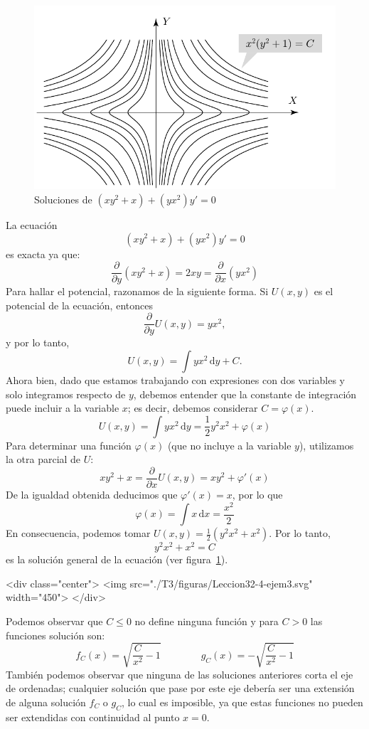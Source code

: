 \begin{latexonly}
\begin{figure}
\begin{center}
\includegraphics[width=.8\textwidth]{T3/figs/ejem3.pdf}
\end{center}
\caption{Soluciones de $(xy^2+x)+(yx^2)y'=0$}\label{ej3}
\end{figure}
\end{latexonly}
%
\begin{ejemplo}\label{42edoexacta}
La ecuación 
\[
(xy^2+x)+(yx^2)y'=0
\]
es exacta ya que:
\[
\dfrac{\partial}{\partial y}(xy^2+x) = 2xy = \dfrac{\partial}{\partial x}(yx^2)
\]
Para hallar el potencial, razonamos de la siguiente forma.
Si $U(x,y)$ es el potencial de la ecuación, entonces
\[
\frac{\partial}{\partial y}U(x,y)= yx^2,
\]
y por lo tanto,
\[
U(x,y)= \int yx^2\,\mathrm dy+C.
\]
Ahora bien, dado que estamos trabajando con expresiones con dos variables y solo integramos respecto de $y$, debemos entender que la constante de integración puede incluir a la variable $x$; es decir, debemos considerar $C=\varphi(x)$.
\[
U(x,y)=\int yx^2\,\mathrm dy= \frac12y^2x^2+\varphi(x)
\]
Para determinar una función $\varphi(x)$ (que no incluye a la variable $y$), utilizamos la otra parcial de $U$:
\[
xy^2+x = \frac{\partial}{\partial x}U(x,y) = xy^2+\varphi'(x)
\]
De la igualdad obtenida deducimos que $\varphi'(x) = x$, por lo que
\[
\varphi(x) = \int x\,\mathrm dx = \dfrac{x^2}2
\]
En consecuencia, podemos tomar $U(x,y)=\frac12(y^2x^2+x^2)$.
Por lo tanto,
\[
y^2x^2+x^2 = C
\]
es la solución general de la ecuación (ver figura~\ref{ej3}).
\begin{rawhtml}
<div class="center">
<img src="./T3/figuras/Leccion32-4-ejem3.svg" width="450">
</div>
\end{rawhtml}
Podemos observar que $C\le0$ no define ninguna función y para $C>0$ las funciones solución son:
$$
f_C(x)=\sqrt{\dfrac{C}{x^2}-1}\qquad\qquad 
g_C(x)=-\sqrt{\dfrac{C}{x^2}-1}
$$
También podemos observar que ninguna de las soluciones anteriores corta el eje de ordenadas;
cualquier solución que pase por este eje debería ser una extensión de alguna solución $f_C$ o $g_C$, lo cual
es imposible, ya que estas funciones no pueden ser extendidas con continuidad al punto $x=0$.
\fej\end{ejemplo}

